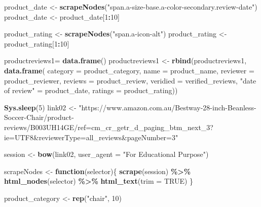 \documentclass[
]{article}
\newenvironment{Shaded}{\begin{snugshade}}{\end{snugshade}}
\newcommand{\AttributeTok}[1]{\textcolor[rgb]{0.13,0.29,0.53}{#1}}
\newcommand{\ConstantTok}[1]{\textcolor[rgb]{0.56,0.35,0.01}{#1}}
\newcommand{\ControlFlowTok}[1]{\textcolor[rgb]{0.13,0.29,0.53}{\textbf{#1}}}
\newcommand{\DecValTok}[1]{\textcolor[rgb]{0.00,0.00,0.81}{#1}}
\newcommand{\FunctionTok}[1]{\textcolor[rgb]{0.13,0.29,0.53}{\textbf{#1}}}
\newcommand{\NormalTok}[1]{#1}
\newcommand{\OtherTok}[1]{\textcolor[rgb]{0.56,0.35,0.01}{#1}}
\newcommand{\SpecialCharTok}[1]{\textcolor[rgb]{0.81,0.36,0.00}{\textbf{#1}}}
\newcommand{\StringTok}[1]{\textcolor[rgb]{0.31,0.60,0.02}{#1}}
\begin{document}
\begin{Shaded}
\begin{Highlighting}[]
\NormalTok{  product\_date }\OtherTok{\textless{}{-}} \FunctionTok{scrapeNodes}\NormalTok{(}\StringTok{"span.a{-}size{-}base.a{-}color{-}secondary.review{-}date"}\NormalTok{)}
\NormalTok{  product\_date }\OtherTok{\textless{}{-}}\NormalTok{ product\_date[}\DecValTok{1}\SpecialCharTok{:}\DecValTok{10}\NormalTok{]}
  
\NormalTok{  product\_rating }\OtherTok{\textless{}{-}} \FunctionTok{scrapeNodes}\NormalTok{(}\StringTok{"span.a{-}icon{-}alt"}\NormalTok{)}
\NormalTok{  product\_rating }\OtherTok{\textless{}{-}}\NormalTok{ product\_rating[}\DecValTok{1}\SpecialCharTok{:}\DecValTok{10}\NormalTok{]}
  
\NormalTok{  productreviews1}\OtherTok{=} \FunctionTok{data.frame}\NormalTok{()}
\NormalTok{  productreviews1 }\OtherTok{\textless{}{-}} \FunctionTok{rbind}\NormalTok{(productreviews1, }\FunctionTok{data.frame}\NormalTok{(}
                      \AttributeTok{category =}\NormalTok{ product\_category,}
                      \AttributeTok{name =}\NormalTok{ product\_name,}
                      \AttributeTok{reviewer =}\NormalTok{ product\_reviewer,}
                      \AttributeTok{reviews =}\NormalTok{ product\_review,}
                      \AttributeTok{veridied =}\NormalTok{ verified\_reviews,}
                      \StringTok{"date of review"} \OtherTok{=}\NormalTok{ product\_date,}
                      \AttributeTok{ratings =}\NormalTok{ product\_rating))}

  
 \FunctionTok{Sys.sleep}\NormalTok{(}\DecValTok{5}\NormalTok{)}
\NormalTok{link02 }\OtherTok{\textless{}{-}} \StringTok{"https://www.amazon.com.au/Bestway{-}28{-}inch{-}Beanless{-}Soccer{-}Chair/product{-}reviews/B003UH14GE/ref=cm\_cr\_getr\_d\_paging\_btm\_next\_3?ie=UTF8\&reviewerType=all\_reviews\&pageNumber=3"}


\NormalTok{  session }\OtherTok{\textless{}{-}} \FunctionTok{bow}\NormalTok{(link02,}
               \AttributeTok{user\_agent =} \StringTok{"For Educational Purpose"}\NormalTok{)}

\NormalTok{  scrapeNodes }\OtherTok{\textless{}{-}} \ControlFlowTok{function}\NormalTok{(selector)\{}
    \FunctionTok{scrape}\NormalTok{(session) }\SpecialCharTok{\%\textgreater{}\%}
      \FunctionTok{html\_nodes}\NormalTok{(selector) }\SpecialCharTok{\%\textgreater{}\%}
      \FunctionTok{html\_text}\NormalTok{(}\AttributeTok{trim =} \ConstantTok{TRUE}\NormalTok{)}
\NormalTok{  \}}

\NormalTok{  product\_category }\OtherTok{\textless{}{-}} \FunctionTok{rep}\NormalTok{(}\StringTok{"chair"}\NormalTok{, }\DecValTok{10}\NormalTok{)}


\end{Highlighting}
\end{Shaded}
\end{document}
